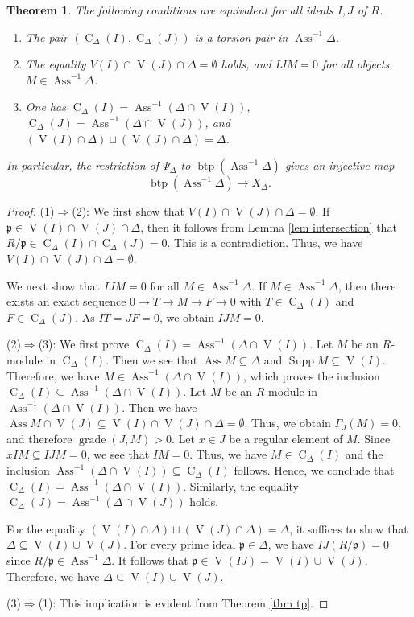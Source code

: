 \documentclass{amsart}
\newtheorem{thm}{Theorem}[section]
\theoremstyle{definition}
\theoremstyle{remark}
\def\Ass{\operatorname{Ass}}
\def\btp{\operatorname{btp}}
\def\CC{\operatorname{C}}
\def\grade{\operatorname{grade}}
\def\p{\mathfrak{p}}
\def\Supp{\operatorname{Supp}}
\def\V{\operatorname{V}}
\begin{document}
\begin{thm}\label{thm btp}
The following conditions are equivalent for all ideals $I,J$ of $R$.
\begin{enumerate}[\rm(1)]
\item 
The pair $(\CC_\Delta(I),\CC_\Delta(J))$ is a torsion pair in $\Ass^{-1}\Delta$.
\item 
The equality $V(I)\cap\V(J)\cap\Delta=\emptyset$ holds, and $IJM=0$ for all objects $M\in\Ass^{-1}\Delta$.
\item 
One has $\CC_\Delta(I)=\Ass^{-1}(\Delta\cap\V(I))$, $\CC_\Delta(J)=\Ass^{-1}(\Delta\cap\V(J))$, and $(\V(I)\cap\Delta)\sqcup(\V(J)\cap\Delta)=\Delta$.
\end{enumerate}
In particular, the restriction of $\Psi_\Delta$ to $\btp(\Ass^{-1}\Delta)$ gives an injective map
$$\btp(\Ass^{-1}\Delta)\longrightarrow X_\Delta.$$
\end{thm}

\begin{proof}
(1)$\Rightarrow$(2):
We first show that $V(I)\cap\V(J)\cap\Delta=\emptyset$. If $\p\in\V(I)\cap\V(J)\cap\Delta$, then it follows from Lemma \ref{lem intersection} that $R/\p\in\CC_\Delta(I)\cap\CC_\Delta(J)=0$. This is a contradiction. Thus, we have $V(I)\cap\V(J)\cap\Delta=\emptyset$.

We next show that $IJM=0$ for all $M\in\Ass^{-1}\Delta$. If $M\in\Ass^{-1}\Delta$, then there exists an exact sequence $0\to T\to M\to F\to0$ with $T\in\CC_\Delta(I)$ and $F\in\CC_\Delta(J)$. As $IT=JF=0$, we obtain $IJM=0$.

(2)$\Rightarrow$(3):
We first prove $\CC_\Delta(I)=\Ass^{-1}(\Delta\cap\V(I))$. Let $M$ be an $R$-module in $\CC_\Delta(I)$. Then we see that $\Ass M\subseteq\Delta$ and $\Supp M\subseteq\V(I)$. Therefore, we have $M\in\Ass^{-1}(\Delta\cap\V(I))$, which proves the inclusion $\CC_\Delta(I)\subseteq\Ass^{-1}(\Delta\cap\V(I))$. Let $M$ be an $R$-module in $\Ass^{-1}(\Delta\cap\V(I))$. Then we have $\Ass M\cap\V(J)\subseteq\V(I)\cap\V(J)\cap\Delta=\emptyset$. Thus, we obtain $\Gamma_J(M)=0$, and therefore $\grade(J,M)>0$. Let $x\in J$ be a regular element of $M$. Since $xIM\subseteq IJM=0$, we see that $IM=0$. Thus, we have $M\in\CC_\Delta(I)$ and the inclusion $\Ass^{-1}(\Delta\cap\V(I))\subseteq\CC_\Delta(I)$ follows. Hence, we conclude that $\CC_\Delta(I)=\Ass^{-1}(\Delta\cap\V(I))$. Similarly, the equality $\CC_\Delta(J)=\Ass^{-1}(\Delta\cap\V(J))$ holds.

For the equality $(\V(I)\cap\Delta)\sqcup(\V(J)\cap\Delta)=\Delta$, it suffices to show that $\Delta\subseteq\V(I)\cup\V(J)$. For every prime ideal $\p\in\Delta$, we have $IJ(R/\p)=0$ since $R/\p\in\Ass^{-1}\Delta$. It follows that $\p\in\V(IJ)=\V(I)\cup\V(J)$. Therefore, we have $\Delta\subseteq\V(I)\cup\V(J)$.

(3)$\Rightarrow$(1):
This implication is evident from Theorem \ref{thm tp}.
\end{proof}
\end{document}
